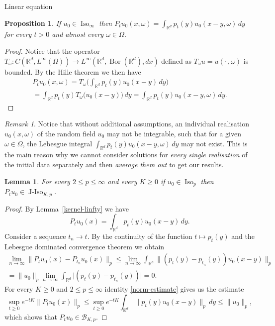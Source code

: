 \documentclass[a4paper,10pt,fleqn]{amsart}
\newtheorem{lemma}[theorem]{Lemma}
\newtheorem{proposition}[theorem]{Proposition}
\theoremstyle{remark}
\newtheorem{remark}[theorem]{Remark}
\theoremstyle{definition}
\DeclareMathOperator{\Bor}{Bor}
\DeclareMathOperator{\Iso}{Iso}
\DeclareMathOperator{\JIso}{J-Iso}
\newcommand{\X} {{\mathbb{R}^d}}
\renewcommand{\=} {\overset{d}{=}}
\begin{document}
\begin{section}{Linear equation}
\begin{proposition}
  If $u_0\in\Iso_\infty$ then $P_t u_0(x,\omega) = \int_\X p_t(y)u_0(x-y,\omega)\,dy$ for every $t>0$ and almost every $\omega\in\Omega$.
  \end{proposition}
  \begin{proof}
  Notice that the operator $T_\omega:C(\X,L^\infty(\Omega))\to L^\infty(\X,\Bor(\X),dx)$ defined as
  $T_\omega u = u(\cdot\,,\omega)$ is bounded. By the Hille theorem we then have
   \begin{multline*}
     P_t u_0(x,\omega) = T_\omega\Big(\int_\X p_t(y)u_0(x-y)\,dy\Big) \\= 
     \int_\X p_t(y)T_\omega \big(u_0(x-y)\big)\,dy = \int_\X p_t(y)u_0(x-y,\omega)\,dy.
   \end{multline*}

  \end{proof}
 \begin{remark}\label{l-infinity}
  Notice that without additional assumptions, an individual realisation $u_0(x,\omega)$
  of the random field $u_0$ may not be integrable, such that for a given $\omega\in\Omega$, the Lebesgue integral
  $\int_\X p_t(y)u_0(x-y,\omega)\,dy$ may not exist. This is the main reason
  why we cannot consider solutions for \emph{every single realisation} of the initial data separately
  and then \emph{average them out} to get our results.
  
 \end{remark}


  \begin{lemma}\label{jiso}
      For every $2\leq p \leq \infty$ and every $K\geq0$ if $u_0\in\Iso_p$ then $P_tu_0\in\JIso_{K,p}$.
  \end{lemma}
  \begin{proof}
      By Lemma~\ref{kernel-linfty} we have
      \begin{equation*}
       P_tu_0(x) = \int_\X p_t(y)u_0(x-y)\,dy.
      \end{equation*}
      Consider a sequence $t_n\to t$. By the continuity of the function $t\mapsto p_t(y)$ and the Lebesgue dominated convergence theorem we obtain
      \begin{multline*}
       \lim_{n\to\infty}\|P_tu_0(x) - P_{t_n}u_0(x)\|_p \leq
       \lim_{n\to\infty}\int_\X\big\|(p_t(y)-p_{t_n}(y))u_0(x-y)\big\|_p\\
       =\|u_0\|_p\lim_{n\to\infty}\int_\X\big|(p_t(y)-p_{t_n}(y))\big|  =0.
      \end{multline*}
      For every $K\geq0$ and $2\leq p\leq\infty$ identity \eqref{norm-estimate} gives us the estimate
      \begin{equation*}
       \sup_{t\geq0}e^{-tK}\|P_tu_0(x)\|_p \leq \sup_{t\geq0}e^{-tK}\int_\X \|p_t(y)u_0(x-y)\|_p\,dy  \leq  \|u_0\|_p,
      \end{equation*}
      which shows that $P_tu_0\in\mathcal{B}_{K,p}$.
      

\end{proof}
\end{section}
\end{document}
